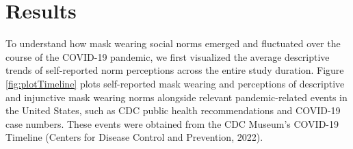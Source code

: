 \documentclass[
  man, donotrepeattitle,mask,floatsintext]{apa6}
\begin{document}
\hypertarget{results}{%
\section{Results}\label{results}}

To understand how mask wearing social norms emerged and fluctuated over the course of the COVID-19 pandemic, we first visualized the average descriptive trends of self-reported norm perceptions across the entire study duration. Figure \ref{fig:plotTimeline} plots self-reported mask wearing and perceptions of descriptive and injunctive mask wearing norms alongside relevant pandemic-related events in the United States, such as CDC public health recommendations and COVID-19 case numbers. These events were obtained from the CDC Museum's COVID-19 Timeline (Centers for Disease Control and Prevention, 2022).
\end{document}
